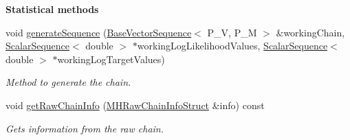 \begin{Indent}{\bf Statistical methods}\par
\begin{DoxyCompactItemize}
\item 
void \hyperlink{class_q_u_e_s_o_1_1_metropolis_hastings_s_g_a34aae6d77dc81adb00e7049942553ae7}{generate\-Sequence} (\hyperlink{class_q_u_e_s_o_1_1_base_vector_sequence}{Base\-Vector\-Sequence}$<$ P\-\_\-\-V, P\-\_\-\-M $>$ \&working\-Chain, \hyperlink{class_q_u_e_s_o_1_1_scalar_sequence}{Scalar\-Sequence}$<$ double $>$ $\ast$working\-Log\-Likelihood\-Values, \hyperlink{class_q_u_e_s_o_1_1_scalar_sequence}{Scalar\-Sequence}$<$ double $>$ $\ast$working\-Log\-Target\-Values)
\begin{DoxyCompactList}\small\item\em Method to generate the chain. \end{DoxyCompactList}\item 
void \hyperlink{class_q_u_e_s_o_1_1_metropolis_hastings_s_g_a1f0aebb8374162b9dee9463412a21436}{get\-Raw\-Chain\-Info} (\hyperlink{struct_q_u_e_s_o_1_1_m_h_raw_chain_info_struct}{M\-H\-Raw\-Chain\-Info\-Struct} \&info) const 
\begin{DoxyCompactList}\small\item\em Gets information from the raw chain. \end{DoxyCompactList}\end{DoxyCompactItemize}
\end{Indent}
